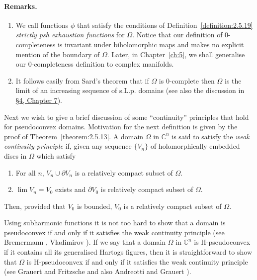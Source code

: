\paragraph*{Remarks.}
\begin{enumerate}
\item We call functions $\phi$ that satisfy the conditions of Definition~\ref{definition:2.5.19} \emph{strictly psh exhaustion functions} for $\Omega$. Notice that our definition of 0-completeness is invariant under biholomorphic maps and makes no explicit mention of the boundary of $\Omega$. Later, in Chapter~\ref{ch:5}, we shall generalise our 0-completeness definition to complex manifolds.
\item It follows easily from Sard's theorem that if $\Omega$ is 0-complete then $\Omega$ is the limit of an increasing sequence of s.L.p. domains (see also the discussion in \hyperref[sec:7:4]{\S4, Chapter 7}).
\end{enumerate}
Next we wish to give a brief discussion of some ``continuity'' principles that hold for pseudoconvex domains. Motivation for the next definition is given by the proof of Theorem~\ref{theorem:2.5.13}.
 A domain $\Omega$ in $\mathbb C^n$ is said to satisfy the \emph{weak continuity principle} if, given any sequence $\{V_n\}$ of holomorphically embedded discs in $\Omega$ which satisfy
\begin{enumerate}
\item For all $n$, $V_n\cup\partial V_n$ is a relatively compact subset of $\Omega$.
\item $\lim V_n=V_0$ exists and $\partial V_0$ is relatively compact subset of $\Omega$.
\end{enumerate}
Then, provided that $V_0$ is bounded, $V_0$ is a relatively compact subset of $\Omega$.

Using subharmonic functions it is not too hard to show that a domain is pseudoconvex if and only if it satisfies the weak continuity principle (see Bremermann \cite{bib:I:bremermann-h-j:2}, Vladimirov \cite{bib:I:vladimirov-v-s:1}). If we say that a domain $\Omega$ in $\mathbb C^n$ is H-pseudoconvex if it contains all its generalised Hartogs figures, then it is straightforward to show that $\Omega$ is H-pseudoconvex if and only if it satisfies the weak continuity principle (see Grauert and Fritzsche \cite{bib:I:grauert-h-and-fritzche-k:1} and also Andreotti and Grauert \cite[page 217ff]{bib:I:andreotti-a-and-grauert-h:1}).

